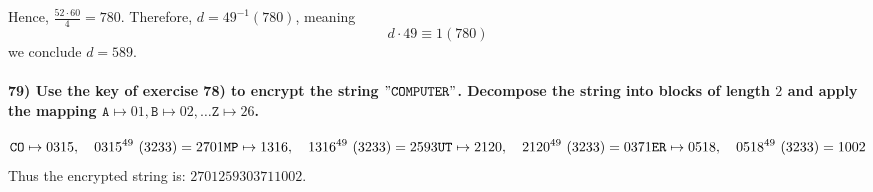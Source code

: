 \documentclass[
]{article}
\begin{document}
Hence, \(\frac{52 \cdot 60}{4} = 780\). Therefore,
\(d = 49^{-1} (780)\), meaning \[
d \cdot 49 \equiv 1 (780)
\] we conclude \(d = 589\).

\hypertarget{use-the-key-of-exercise-78-to-encrypt-the-string-mathttcomputer.-decompose-the-string-into-blocks-of-length-2-and-apply-the-mapping-mathtta-mapsto-01-mathttb-mapsto-02-dots-mathttz-mapsto-26.}{%
\paragraph{\texorpdfstring{79) Use the key of exercise 78) to encrypt
the string \(\mathtt{"COMPUTER"}\). Decompose the string into blocks of
length \(2\) and apply the mapping
\(\mathtt{A} \mapsto 01, \mathtt{B} \mapsto 02, \dots \mathtt{Z} \mapsto 26\).}{79) Use the key of exercise 78) to encrypt the string \textbackslash mathtt\{"COMPUTER"\}. Decompose the string into blocks of length 2 and apply the mapping \textbackslash mathtt\{A\} \textbackslash mapsto 01, \textbackslash mathtt\{B\} \textbackslash mapsto 02, \textbackslash dots \textbackslash mathtt\{Z\} \textbackslash mapsto 26.}}\label{use-the-key-of-exercise-78-to-encrypt-the-string-mathttcomputer.-decompose-the-string-into-blocks-of-length-2-and-apply-the-mapping-mathtta-mapsto-01-mathttb-mapsto-02-dots-mathttz-mapsto-26.}}

\[
\mathtt{CO} \mapsto 0315, \quad 0315^{49} \ (3233) = 2701 \\
\mathtt{MP} \mapsto 1316, \quad 1316^{49} \ (3233) = 2593 \\
\mathtt{UT} \mapsto 2120, \quad 2120^{49} \ (3233) = 0371 \\
\mathtt{ER} \mapsto 0518, \quad 0518^{49} \ (3233) = 1002 \\
\] Thus the encrypted string is: \(2701 2593 0371 1002\).
\end{document}
